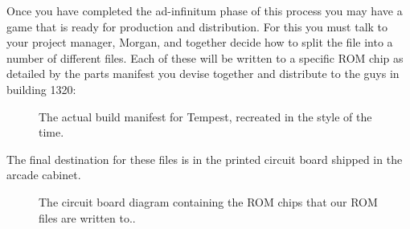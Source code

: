 Once you have completed the ad-infinitum phase of this process you may have a game that is ready
for production and distribution. For this you must talk to your project manager, Morgan, and together
decide how to split the  file into a number of different files. Each of these will
be written to a specific ROM chip as detailed by the parts manifest you devise together and distribute to
the guys in building 1320:
\begin{figure}[H]
      \centering
    \caption{The actual build manifest for Tempest, recreated in the style of the time.}
\end{figure}
The final destination for these files is in the printed circuit board shipped in the arcade cabinet.
\begin{figure}[H]
      \centering
    \caption{The circuit board diagram containing the ROM chips that our ROM files are written to..}
\end{figure}


